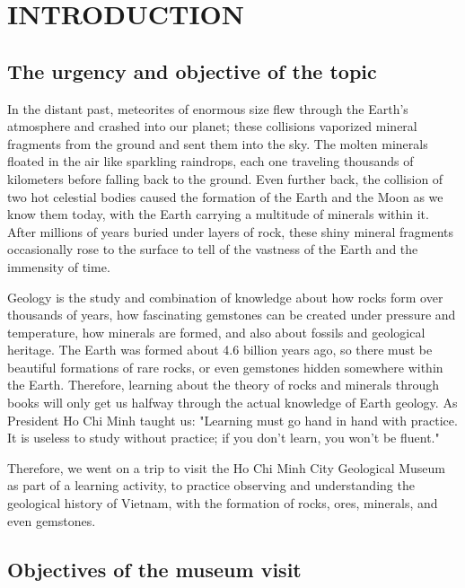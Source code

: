 \section{INTRODUCTION}
\label{chap:introduction}

\subsection{The urgency and objective of the topic}
\label{subsec:urgency-objective}

In the distant past, meteorites of enormous size flew through the Earth's atmosphere and crashed into our planet; these collisions vaporized mineral fragments from the ground and sent them into the sky. The molten minerals floated in the air like sparkling raindrops, each one traveling thousands of kilometers before falling back to the ground. Even further back, the collision of two hot celestial bodies caused the formation of the Earth and the Moon as we know them today, with the Earth carrying a multitude of minerals within it. After millions of years buried under layers of rock, these shiny mineral fragments occasionally rose to the surface to tell of the vastness of the Earth and the immensity of time.

Geology is the study and combination of knowledge about how rocks form over thousands of years, how fascinating gemstones can be created under pressure and temperature, how minerals are formed, and also about fossils and geological heritage. The Earth was formed about 4.6 billion years ago, so there must be beautiful formations of rare rocks, or even gemstones hidden somewhere within the Earth. Therefore, learning about the theory of rocks and minerals through books will only get us halfway through the actual knowledge of Earth geology. As President Ho Chi Minh taught us: "Learning must go hand in hand with practice. It is useless to study without practice; if you don't learn, you won't be fluent."

Therefore, we went on a trip to visit the Ho Chi Minh City Geological Museum as part of a learning activity, to practice observing and understanding the geological history of Vietnam, with the formation of rocks, ores, minerals, and even gemstones.

\subsection{Objectives of the museum visit}
\label{subsec:objectives}

